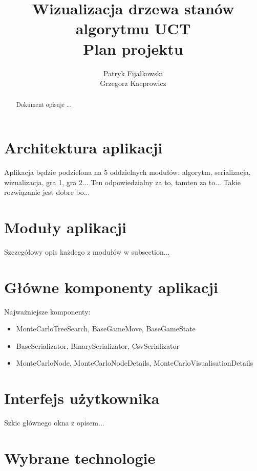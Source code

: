 \documentclass{article}
\title{
	Wizualizacja drzewa stanów algorytmu UCT \\
	\large Plan projektu}
\author{Patryk Fijałkowski \\ Grzegorz Kacprowicz}
\let\oldsection\section
\renewcommand\section{\clearpage\oldsection}
\begin{document}
	\begin{titlingpage}
		\maketitle
		\vspace{3cm}
		\begin{abstract}
			Dokument opisuje ...
		\end{abstract}
	\end{titlingpage}

	\begin{versionhistory}
	\end{versionhistory}
	
	\tableofcontents
	
	\section{Architektura aplikacji}
	Aplikacja będzie podzielona na 5 oddzielnych modułów: algorytm, serializacja, wizualizacja, gra 1, gra 2... Ten odpowiedzialny za to, tamten za to... Takie rozwiązanie jest dobre bo...
	
	
	\section{Moduły aplikacji}
	Szczegółowy opis każdego z modułów w subsection...
	
	
	\section{Główne komponenty aplikacji}
	Najważniejsze komponenty:
	\begin{itemize}
		\item MonteCarloTreeSearch, BaseGameMove, BaseGameState
		\item BaseSerializator, BinarySerializator, CsvSerializator
		\item MonteCarloNode, MonteCarloNodeDetails, MonteCarloVisualisationDetails
	\end{itemize}
	
	\section{Interfejs użytkownika}
	Szkic głównego okna z opisem...
	
	\section{Wybrane technologie}
\end{document}
